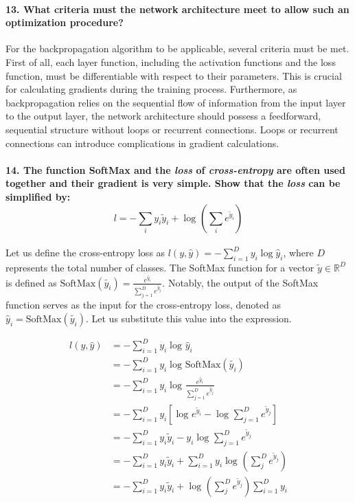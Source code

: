 \paragraph{13. What criteria must the network architecture meet to allow such an optimization procedure?}
For the backpropagation algorithm to be applicable, several criteria must be met. First of all, each layer function, including the activation functions and the loss function, must be differentiable with respect to their parameters. This is crucial for calculating gradients during the training process. Furthermore, as backpropagation relies on the sequential flow of information from the input layer to the output layer, the network architecture should possess a feedforward, sequential structure without loops or recurrent connections. Loops or recurrent connections can introduce complications in gradient calculations.

\paragraph{14. The function SoftMax and the \textit{loss} of \textit{cross-entropy} are often used together and their gradient is very simple. Show that the \textit{loss} can be simpliﬁed by:
    \[l = - \sum_{i}^{} y_i \tilde{y}_i + \log_{} \left(\sum_{i}^{} e^{\tilde{y}_i}\right)\]}
Let us define the cross-entropy loss as \( l(y, \hat{y}) = - \sum_{i=1}^{D} y_i \log \hat{y}_i \), where \( D \) represents the total number of classes. The SoftMax function for a vector \( \tilde{y} \in \mathbb{R}^D \) is defined as \( \text{SoftMax}(\tilde{y_i}) = \frac{e^{\tilde{y_i}}}{\sum_{j=1}^{D} e^{\tilde{y_j}}} \). Notably, the output of the SoftMax function serves as the input for the cross-entropy loss, denoted as \( \hat{y}_i = \text{SoftMax}(\tilde{y_i}) \). Let us substitute this value into the expression.

\begin{align*}
    l(y, \hat{y}) & = - \sum_{i=1}^{D} y_i \log_{} \hat{y}_i                                                                 \\
                  & = - \sum_{i=1}^{D} y_i \log_{} \text{SoftMax}(\tilde{y_i})                                               \\
                  & = - \sum_{i=1}^{D} y_i \log_{} \frac{e^{\tilde{y_i}}}{\sum_{j=1}^{D} e^{\tilde{y_j}} }                   \\
                  & = - \sum_{i=1}^{D} y_i \left[ \log_{} e^{\tilde{y}_i} - \log_{} \sum_{j=1}^{D} e^{\tilde{y}_j}  \right]  \\
                  & = - \sum_{i=1}^{D} y_i \tilde{y}_i - y_i \log_{} \sum_{j=1}^{D}e^{\tilde{y}_j}                           \\
                  & = - \sum_{i=1}^{D} y_i \tilde{y}_i + \sum_{i=1}^{D} y_i \log_{} \left(\sum_{j}^{D}e^{\tilde{y}_j}\right) \\
                  & = - \sum_{i=1}^{D} y_i \tilde{y}_i + \log_{} \left(\sum_{j}^{D}e^{\tilde{y}_j}\right) \sum_{i=1}^{D} y_i
\end{align*}

